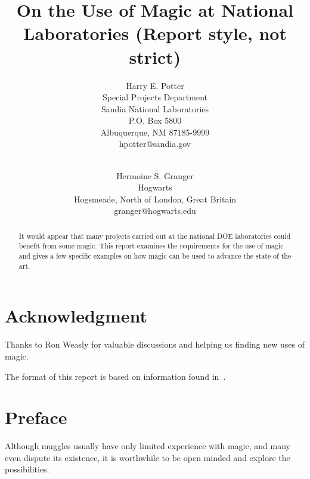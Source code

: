 \documentclass[pdf,ps2pdf,12pt,report,OUO]{SANDreport}
\title{On the Use of Magic at National Laboratories (Report style, not strict)}
\author{Harry E. Potter \\
	  Special Projects Department \\
	  Sandia National Laboratories\\
	  P.O. Box 5800\\
	  Albuquerque, NM 87185-9999 \\
	  hpotter@sandia.gov \\
	  \\
	  \and
	  Hermoine S. Granger \\
	  Hogwarts \\
	  Hogsmeade, North of London, Great Britain\\
	  granger@hogwarts.edu
	 }
\date{}
\begin{document}
    \maketitle

    \begin{abstract}
	It would appear that many projects carried out at the
	national DOE laboratories could benefit from some magic. This
	report examines the requirements for the use of magic and
	gives a few specific examples on how magic can be used to
	advance the state of the art.
    \end{abstract}


    \clearpage
    \chapter*{Acknowledgment}
	Thanks to Ron Weasly for valuable discussions and helping
	us finding new uses of magic.

	The format of this report is based on information found
	in~\cite{Sand98-0730}.


    \cleardoublepage		%
    \tableofcontents
    \listoffigures
    \listoftables


    \clearpage
    \chapter*{Preface}
	Although muggles usually have only limited experience with
	magic, and many even dispute its existence, it is worthwhile
	to be open minded and explore the possibilities.
\end{document}
